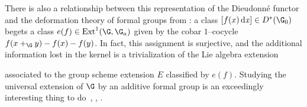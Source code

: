 \begin{remark}\label{ExtensionsPresentationOfDieudonne}
There is also a relationship between this representation of the Dieudonn\'e functor and the deformation theory of formal groups from : a class \([f(x)\dx] \in D^*(\G_0)\) begets a class \(e(f) \in \Ext^1(\G, \G_a)\) given by the cobar \(1\)--cocycle \(f(x +_{\G} y) - f(x) - f(y)\).
In fact, this assignment is surjective, and the additional information lost in the kernel is a trivialization of the Lie algebra extension
\begin{center}
\end{center}
associated to the group scheme extension \(E\) classified by \(e(f)\).
Studying the universal extension of \(\G\) by an additive formal group is an exceedingly interesting thing to do~\cite[Section V.4]{GrothendieckCristaux}, \cite{MazurMessing}, \cite[Section 11]{HopkinsGrossEquivVBs}.
\end{remark}

